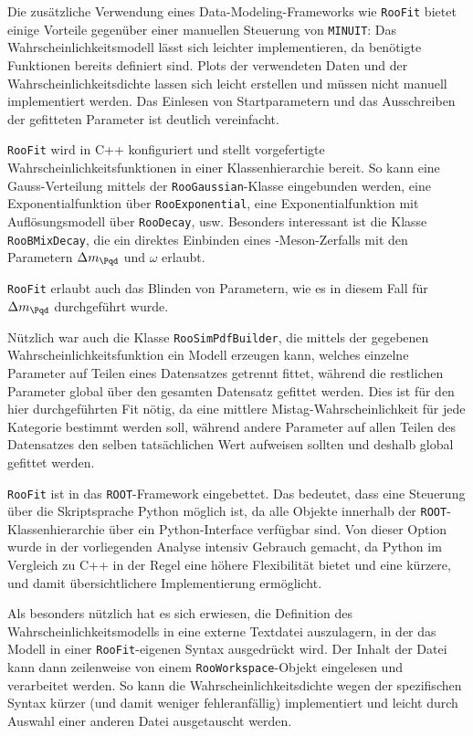 Die zusätzliche Verwendung eines Data-Modeling-Frameworks wie \texttt{RooFit} bietet einige Vorteile gegenüber einer manuellen Steuerung von \texttt{MINUIT}:
Das Wahrscheinlichkeitsmodell lässt sich leichter implementieren, da benötigte Funktionen bereits definiert sind.
Plots der verwendeten Daten und der Wahrscheinlichkeitsdichte lassen sich leicht erstellen und müssen nicht manuell implementiert werden.
Das Einlesen von Startparametern und das Ausschreiben der gefitteten Parameter ist deutlich vereinfacht.

\texttt{RooFit} wird in C++ konfiguriert und stellt vorgefertigte Wahrscheinlichkeitsfunktionen in einer Klassenhierarchie bereit.
So kann eine Gauss-Verteilung mittels der \texttt{RooGaussian}-Klasse eingebunden werden, eine Exponentialfunktion über \texttt{RooExponential}, eine Exponentialfunktion mit Auflösungsmodell über \texttt{RooDecay}, usw.
Besonders interessant ist die Klasse \texttt{RooBMixDecay}, die ein direktes Einbinden eines \PB-Meson-Zerfalls mit den Parametern $\difference{m_{\Pqd}}$ und $ω$ erlaubt.

\texttt{RooFit} erlaubt auch das Blinden von Parametern, wie es in diesem Fall für $\difference{m_{\Pqd}}$ durchgeführt wurde.

Nützlich war auch die Klasse \texttt{RooSimPdfBuilder}, die mittels der gegebenen Wahrscheinlichkeitsfunktion ein Modell erzeugen kann, welches einzelne Parameter auf Teilen eines Datensatzes getrennt fittet, während die restlichen Parameter global über den gesamten Datensatz gefittet werden.
Dies ist für den hier durchgeführten Fit nötig, da eine mittlere Mistag-Wahrscheinlichkeit für jede Kategorie bestimmt werden soll, während andere Parameter auf allen Teilen des Datensatzes den selben tatsächlichen Wert aufweisen sollten und deshalb global gefittet werden.

\texttt{RooFit} ist in das \texttt{ROOT}-Framework eingebettet.
Das bedeutet, dass eine Steuerung über die Skriptsprache Python möglich ist, da alle Objekte innerhalb der \texttt{ROOT}-Klassenhierarchie über ein Python-Interface verfügbar sind.
Von dieser Option wurde in der vorliegenden Analyse intensiv Gebrauch gemacht, da Python im Vergleich zu C++ in der Regel eine höhere Flexibilität bietet und eine kürzere, und damit übersichtlichere Implementierung ermöglicht.

Als besonders nützlich hat es sich erwiesen, die Definition des Wahrscheinlichkeitsmodells in eine externe Textdatei auszulagern, in der das Modell in einer \texttt{RooFit}-eigenen Syntax ausgedrückt wird.
Der Inhalt der Datei kann dann zeilenweise von einem \texttt{RooWorkspace}-Objekt eingelesen und verarbeitet werden.
So kann die Wahrscheinlichkeitsdichte wegen der spezifischen Syntax kürzer (und damit weniger fehleranfällig) implementiert und leicht durch Auswahl einer anderen Datei ausgetauscht werden.

